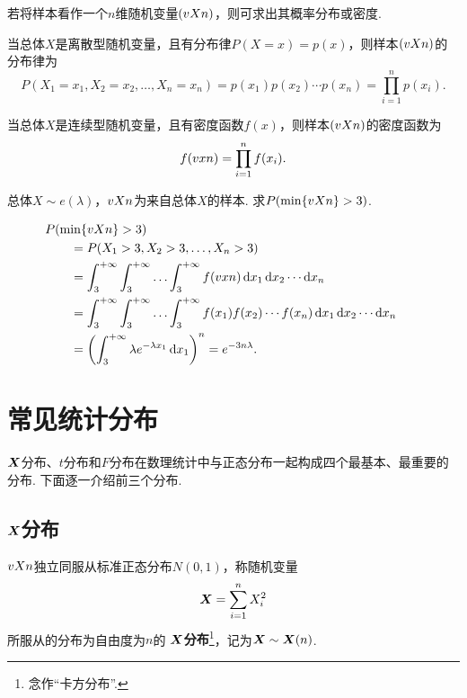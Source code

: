 若将样本看作一个\(n\)维随机变量\((v{X}{n})\)，则可求出其概率分布或密度.

当总体\(X\)是离散型随机变量，且有分布律\(P(X = x) = p(x)\)，则样本\((v{X}{n})\)的分布律为\[
P(X_1=x_1,X_2=x_2,\dotsc,X_n=x_n)
= p(x_1) p(x_2) \dotsm p(x_n)
= \prod_{i=1}^n p(x_i).
\]

当总体\(X\)是连续型随机变量，且有密度函数\(f(x)\)，则样本\((v{X}{n})\)的密度函数为\[
f(v{x}{n}) = \prod_{i=1}^n f(x_i).
\]

\begin{example}
总体\(X \sim e(\lambda)\)，\(v{X}{n}\)为来自总体\(X\)的样本.
\def\P{P(\min\{\v{X}{n}\}>3)}
求\(\P\).
\begin{solution}
\def\intx{\int_3^{+\infty}}
\def\into{\intx \intx \dotso \intx}
\def\ddx{\dd{x_1} \dd{x_2} \dotsm \dd{x_n}}
\begin{align*}
&\hspace{-20pt}\P \\
&= P(X_1>3,X_2>3,\dotsc,X_n>3) \\
&= \into f(\v{x}{n}) \ddx \\
&= \into f(x_1) f(x_2) \dotsm f(x_n) \ddx \\
&= \left( \intx \lambda e^{-\lambda x_1} \dd{x_1} \right)^n
= e^{-3n\lambda}.
\end{align*}
\end{solution}
\end{example}

\section{常见统计分布}
\(\boldsymbol{X}\)分布、\(t\)分布和\(F\)分布在数理统计中与正态分布一起构成四个最基本、最重要的分布.
下面逐一介绍前三个分布.

\subsection{\texorpdfstring{\(\boldsymbol{X}\)}{卡方}分布}
\begin{definition}\label{definition:数理统计的基础知识.卡方分布的定义}
\(v{X}{n}\)独立同服从标准正态分布\(N(0,1)\)，称随机变量\[
\boldsymbol{X} = \sum\limits_{i=1}^n{X_i^2}
\]所服从的分布为自由度为\(n\)的 \textbf{ \(\boldsymbol{X}\)分布}\footnote{念作“卡方分布”.}，记为\(\boldsymbol{X} \sim \boldsymbol{X}(n)\).
\end{definition}

